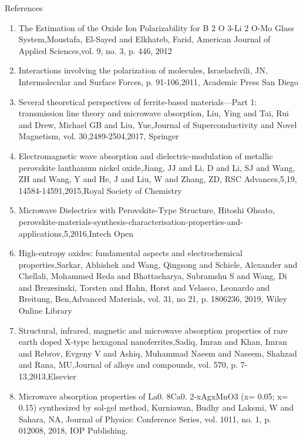 \documentclass[11pt,aspect ratio=169]{beamer}
\begin{document}
\begin{frame}[allowframebreaks]{References}
\begin{enumerate}
\item
 The Estimation of the Oxide Ion Polarizability for B 2 O 3-Li 2 O-Mo Glass System,Moustafa, El-Sayed and Elkhateb, Farid,
American Journal of Applied Sciences,vol. 9,	no. 3,	p. 446,
2012

\item
 Interactions involving the polarization of molecules,
Israelachvili, JN,
Intermolecular and Surface Forces,
p. 91-106,2011,	Academic Press San Diego

\item Several theoretical perspectives of ferrite-based materials—Part 1: transmission line theory and microwave absorption,	Liu, Ying and Tai, Rui and Drew, Michael GB and Liu, Yue,Journal of Superconductivity and Novel Magnetism,
	vol. 30,2489-2504,2017,
	Springer

\item
 Electromagnetic wave absorption and dielectric-modulation of metallic perovskite lanthanum nickel oxide,Jiang, JJ and Li, D and Li, SJ and Wang, ZH and Wang, Y and He, J and Liu, W and Zhang, ZD, RSC Advances,5,19,
14584-14591,2015,Royal Society of Chemistry

\item Microwave Dielectrics with Perovskite-Type Structure,
Hitoshi Ohsato,
perovskite-materials-synthesis-characterisation-properties-and-applications,5,2016,Intech Open

\item High-entropy oxides: fundamental aspects and electrochemical properties,Sarkar, Abhishek and Wang, Qingsong and Schiele, Alexander and Chellali, Mohammed Reda and Bhattacharya, Subramshu S and Wang, Di and Brezesinski, Torsten and Hahn, Horst and Velasco, Leonardo and Breitung, Ben,Advanced Materials,
	vol. 31,
	no 21,
	p. 1806236,
	2019,
	Wiley Online Library

\item Structural, infrared, magnetic and microwave absorption properties of rare earth doped X-type hexagonal nanoferrites,Sadiq, Imran and Khan, Imran and Rebrov, Evgeny V and Ashiq, Muhammad Naeem and Naseem, Shahzad and Rana, MU,Journal of alloys and compounds,
	vol. 570,
	p. 7-13,2013,Elsevier
	
	
\item   Microwave absorption properties of La0. 8Ca0. 2-xAgxMnO3 (x= 0.05; x= 0.15) synthesized by sol-gel method,
	Kurniawan, Budhy and Laksmi, W and Sahara, NA,
	Journal of Physics: Conference Series,
	vol. 1011,
	no. 1,
	p. 012008,
	2018,
	IOP Publishing.
	

\end{enumerate}
\end{frame}
\end{document}
